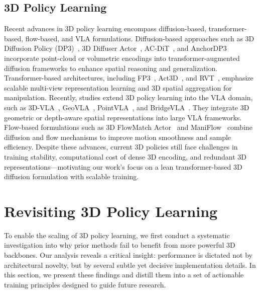 \documentclass[runningheads]{llncs}
\begin{document}
\subsection{3D Policy Learning}
Recent advances in 3D policy learning encompass diffusion-based, transformer-based, flow-based, and VLA formulations. 
Diffusion-based approaches such as 3D Diffusion Policy (DP3)~\cite{ze20243d}, 3D Diffuser Actor~\cite{ke20243ddiffuseractorpolicy}, AC-DiT~\cite{chen2025acditadaptivecoordinationdiffusion}, and AnchorDP3~\cite{zhao2025anchordp33daffordanceguided} incorporate point-cloud or volumetric encodings into transformer-augmented diffusion frameworks to enhance spatial reasoning and generalization. 
Transformer-based architectures, including FP3~\cite{yang2025fp33dfoundationpolicy}, Act3D~\cite{gervet2023act3d3dfeaturefield}, and RVT~\cite{pmlr-v229-goyal23a}, emphasize scalable multi-view representation learning and 3D spatial aggregation for manipulation. 
Recently, studies extend 3D policy learning into the VLA domain, such as 3D-VLA~\cite{zhen20243dvla3dvisionlanguageactiongenerative}, GeoVLA~\cite{sun2025geovlaempowering3drepresentations}, PointVLA~\cite{li2025pointvlainjecting3dworld}, and BridgeVLA~\cite{li2025bridgevlainputoutputalignmentefficient}.
They integrate 3D geometric or depth-aware spatial representations into large VLA frameworks.
Flow-based formulations such as 3D FlowMatch Actor~\cite{gkanatsios20253dflowmatchactorunified} and ManiFlow~\cite{yan2025maniflowgeneralrobotmanipulation} combine diffusion and flow mechanisms to improve motion smoothness and sample efficiency.  
Despite these advances, current 3D policies still face challenges in training stability, computational cost of dense 3D encoding, and redundant 3D representations—motivating our work’s focus on a lean transformer-based 3D diffusion formulation with scalable training.


\section{Revisiting 3D Policy Learning}
\label{sec:revisiting}

To enable the scaling of 3D policy learning, we first conduct a systematic investigation into why prior methods fail to benefit from more powerful 3D backbones. Our analysis reveals a critical insight: performance is dictated not by architectural novelty, but by several subtle yet decisive implementation details. In this section, we present these findings and distill them into a set of actionable training principles designed to guide future research.
\end{document}
